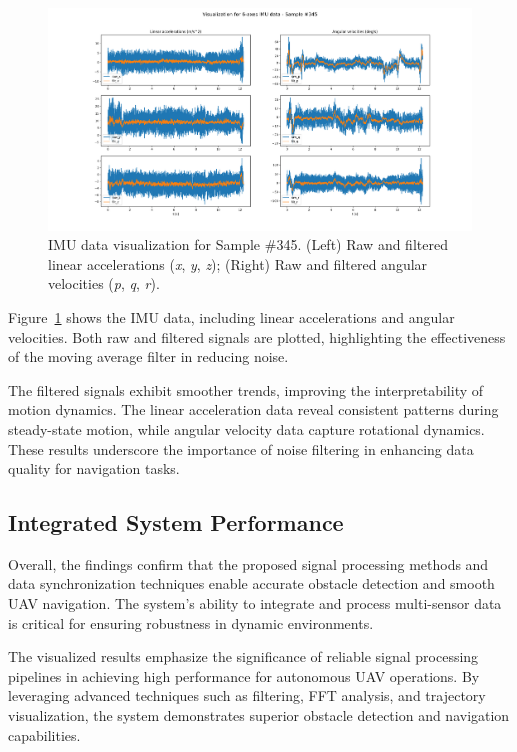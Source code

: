 \documentclass[12pt,a4paper]{article}
\begin{document}
\begin{figure}[h!]
    \centering
    \includegraphics[width=\textwidth]{test_imu_345.png}
    \caption{IMU data visualization for Sample \#345. (Left) Raw and filtered linear accelerations (\textit{x}, \textit{y}, \textit{z}); (Right) Raw and filtered angular velocities (\textit{p}, \textit{q}, \textit{r}).}
    \label{fig:IMU}
\end{figure}

Figure~\ref{fig:IMU} shows the IMU data, including linear accelerations and angular velocities. Both raw and filtered signals are plotted, highlighting the effectiveness of the moving average filter in reducing noise. 

The filtered signals exhibit smoother trends, improving the interpretability of motion dynamics. The linear acceleration data reveal consistent patterns during steady-state motion, while angular velocity data capture rotational dynamics. These results underscore the importance of noise filtering in enhancing data quality for navigation tasks.

\subsection{Integrated System Performance}

Overall, the findings confirm that the proposed signal processing methods and data synchronization techniques enable accurate obstacle detection and smooth UAV navigation. The system's ability to integrate and process multi-sensor data is critical for ensuring robustness in dynamic environments. 

The visualized results emphasize the significance of reliable signal processing pipelines in achieving high performance for autonomous UAV operations. By leveraging advanced techniques such as filtering, FFT analysis, and trajectory visualization, the system demonstrates superior obstacle detection and navigation capabilities.
\end{document}
